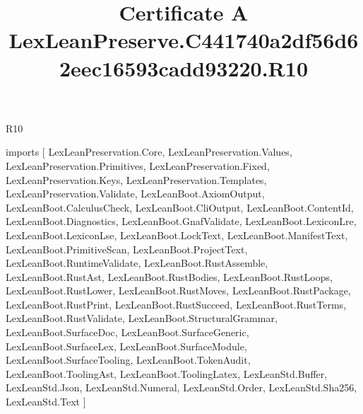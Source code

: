 \begin{lexlean}{R10}
\title{Certificate A LexLeanPreserve.C441740a2df56d62eec16593cadd93220.R10}
\begin{coremodule}
imports [
  LexLeanPreservation.Core,
  LexLeanPreservation.Values,
  LexLeanPreservation.Primitives,
  LexLeanPreservation.Fixed,
  LexLeanPreservation.Keys,
  LexLeanPreservation.Templates,
  LexLeanPreservation.Validate,
  LexLeanBoot.AxiomOutput,
  LexLeanBoot.CalculusCheck,
  LexLeanBoot.CliOutput,
  LexLeanBoot.ContentId,
  LexLeanBoot.Diagnostics,
  LexLeanBoot.GnafValidate,
  LexLeanBoot.LexiconLre,
  LexLeanBoot.LexiconLse,
  LexLeanBoot.LockText,
  LexLeanBoot.ManifestText,
  LexLeanBoot.PrimitiveScan,
  LexLeanBoot.ProjectText,
  LexLeanBoot.RuntimeValidate,
  LexLeanBoot.RustAssemble,
  LexLeanBoot.RustAst,
  LexLeanBoot.RustBodies,
  LexLeanBoot.RustLoops,
  LexLeanBoot.RustLower,
  LexLeanBoot.RustMoves,
  LexLeanBoot.RustPackage,
  LexLeanBoot.RustPrint,
  LexLeanBoot.RustSucceed,
  LexLeanBoot.RustTerms,
  LexLeanBoot.RustValidate,
  LexLeanBoot.StructuralGrammar,
  LexLeanBoot.SurfaceDoc,
  LexLeanBoot.SurfaceGeneric,
  LexLeanBoot.SurfaceLex,
  LexLeanBoot.SurfaceModule,
  LexLeanBoot.SurfaceTooling,
  LexLeanBoot.TokenAudit,
  LexLeanBoot.ToolingAst,
  LexLeanBoot.ToolingLatex,
  LexLeanStd.Buffer,
  LexLeanStd.Json,
  LexLeanStd.Numeral,
  LexLeanStd.Order,
  LexLeanStd.Sha256,
  LexLeanStd.Text
]


\end{coremodule}
\end{lexlean}
